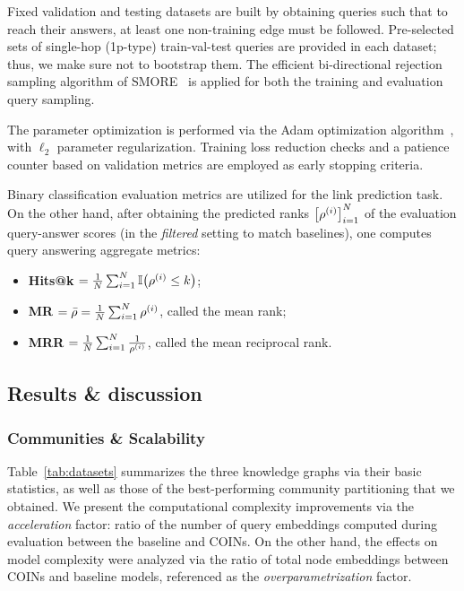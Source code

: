 Fixed validation and testing datasets are built by obtaining queries such that to reach their answers, at least one non-training edge must be followed. Pre-selected sets of single-hop (1p-type) train-val-test queries are provided in each dataset; thus, we make sure not to bootstrap them. The efficient bi-directional rejection sampling algorithm of SMORE~\cite{ren_smore_2021} is applied for both the training and evaluation query sampling. 

The parameter optimization is performed via the Adam optimization algorithm~\cite{kingma_adam_2015}, with $\ell_2$ parameter regularization. Training loss reduction checks and a patience counter based on validation metrics are employed as early stopping criteria.

Binary classification evaluation metrics are utilized for the link prediction task. On the other hand, after obtaining the predicted ranks $\mathopen{}\left[\rho^{\mathopen{}\left(i\right)}\right]_{i=1}^{N}$ of the evaluation query-answer scores (in the \emph{filtered} setting to match baselines), one computes query answering aggregate metrics:
\begin{itemize}
    \item \textbf{Hits@k} $= \frac{1}{N}\sum_{i=1}^{N}{\mathbb{I}\mathopen{}\left(\rho^{\mathopen{}\left(i\right)} \leq k\right)}$;
    \item \textbf{MR} $= \bar{\rho} = \frac{1}{N}\sum_{i=1}^{N}{\rho^{\mathopen{}\left(i\right)}}$, called the mean rank;
    \item \textbf{MRR} $= \frac{1}{N}\sum_{i=1}^{N}{\frac{1}{\rho^{\mathopen{}\left(i\right)}}}$, called the mean reciprocal rank.
\end{itemize}

\subsection{Results \& discussion}
\label{sec:results}

\subsubsection{Communities \& Scalability}

Table~\ref{tab:datasets} summarizes the three knowledge graphs via their basic statistics, as well as those of the best-performing community partitioning that we obtained. We present the computational complexity improvements via the \emph{acceleration} factor: ratio of the number of query embeddings computed during evaluation between the baseline and COINs. On the other hand, the effects on model complexity were analyzed via the ratio of total node embeddings between COINs and baseline models, referenced as the \emph{overparametrization} factor. 

